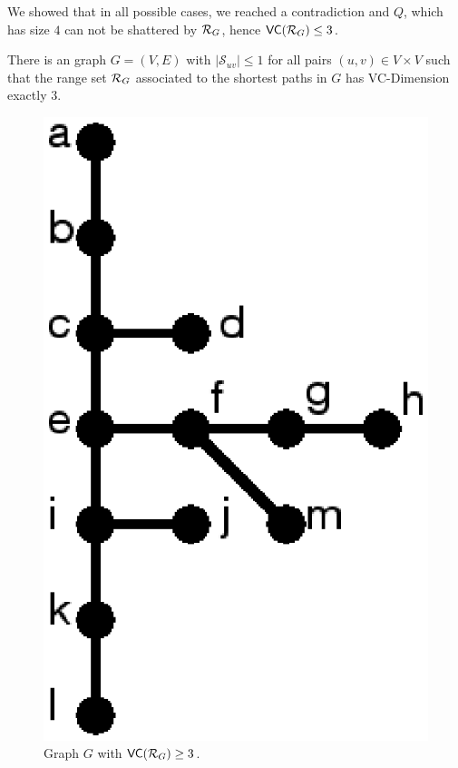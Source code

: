 \begin{IEEEproof}
  We showed that in all possible cases, we reached a contradiction and $Q$,
  which has size $4$ can not be shattered by $\mathcal{R}_G$, hence $\mathsf{VC}(\mathcal{R}_G)\le
  3$.
\end{IEEEproof}

\begin{lemma}\label{lem:vcdimlowboundunique}
  There is an graph $G=(V,E)$ with $|\mathcal{S}_{uv}|\le1$ for all
  pairs $(u,v)\in V\times V$ such that the range set $\mathcal{R}_G$ associated to the
  shortest paths in $G$ has VC-Dimension exactly $3$.
\end{lemma}

\begin{figure}[ht]
  \centering
  \includegraphics[scale=0.3]{uniqueshortestpathtight}
  \caption{Graph $G$ with $\mathsf{VC}(\mathcal{R}_G)\ge 3$.}
  \label{fig:uniquetight}
\end{figure}

